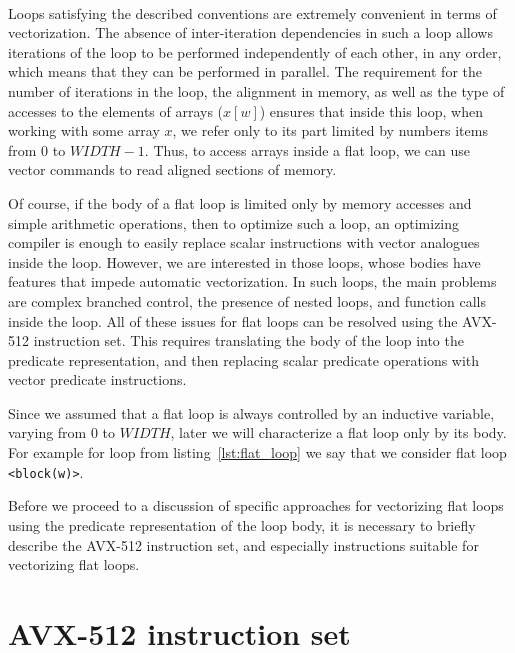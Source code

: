\documentclass[
11pt,%
tightenlines,%
twoside,%
onecolumn,%
nofloats,%
nobibnotes,%
nofootinbib,%
superscriptaddress,%
noshowpacs,%
centertags]%
{revtex4}
\begin{document}
\

Loops satisfying the described conventions are extremely convenient in terms of vectorization.
The absence of inter-iteration dependencies in such a loop allows iterations of the loop to be performed independently of each other, in any order, which means that they can be performed in parallel.
The requirement for the number of iterations in the loop, the alignment in memory, as well as the type of accesses to the elements of arrays ($x[w]$) ensures that inside this loop, when working with some array $x$, we refer only to its part limited by numbers items from $0$ to $WIDTH-1$.
Thus, to access arrays inside a flat loop, we can use vector commands to read aligned sections of memory.

Of course, if the body of a flat loop is limited only by memory accesses and simple arithmetic operations, then to optimize such a loop, an optimizing compiler is enough to easily replace scalar instructions with vector analogues inside the loop.
However, we are interested in those loops, whose bodies have features that impede automatic vectorization.
In such loops, the main problems are complex branched control, the presence of nested loops, and function calls inside the loop.
All of these issues for flat loops can be resolved using the AVX-512 instruction set.
This requires translating the body of the loop into the predicate representation, and then replacing scalar predicate operations with vector predicate instructions.

Since we assumed that a flat loop is always controlled by an inductive variable, varying from $0$ to $WIDTH$, later we will characterize a flat loop only by its body.
For example for loop from listing~\ref{lst:flat_loop} we say that we consider flat loop \texttt{<block(w)>}.

Before we proceed to a discussion of specific approaches for vectorizing flat loops using the predicate representation of the loop body, it is necessary to briefly describe the AVX-512 instruction set, and especially instructions suitable for vectorizing flat loops.

\section{AVX-512 instruction set}
\end{document}
